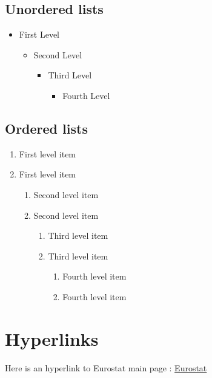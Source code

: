 \documentclass[Theme1]{{template_material/eurostat}}
\begin{document}
\subsection{Unordered lists}
 \begin{itemize}
   \item  First Level
   \begin{itemize}
     \item  Second Level
     \begin{itemize}
       \item  Third Level
       \begin{itemize}
         \item  Fourth Level
       \end{itemize}
     \end{itemize}
   \end{itemize}
 \end{itemize}

\subsection{Ordered lists}
\begin{enumerate}
   \item First level item
   \item First level item
   \begin{enumerate}
     \item Second level item
     \item Second level item
     \begin{enumerate}
       \item Third level item
       \item Third level item
       \begin{enumerate}
         \item Fourth level item
         \item Fourth level item
       \end{enumerate}
     \end{enumerate}
   \end{enumerate}
 \end{enumerate}
\newpage %


\section{Hyperlinks}

Here is an hyperlink to Eurostat main page : \href{https://ec.europa.eu/eurostat/fr/home}{Eurostat} 
\end{document}

